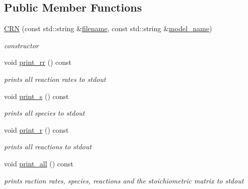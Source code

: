 \subsection*{Public Member Functions}
\begin{DoxyCompactItemize}
\item 
\mbox{\hyperlink{classCRN_acea074d74a2269357d14c6f667649293}{C\+RN}} (const std\+::string \&\mbox{\hyperlink{classCRN_a4ef4514e0ffba7b9358b37636a7f7fb4}{filename}}, const std\+::string \&\mbox{\hyperlink{classCRN_a9ab0e43893870c6961fd0febafc99161}{model\+\_\+name}})
\begin{DoxyCompactList}\small\item\em constructor \end{DoxyCompactList}\item 
void \mbox{\hyperlink{classCRN_a9ea712620fa755231213a59e4da33521}{print\+\_\+rr}} () const
\begin{DoxyCompactList}\small\item\em prints all reaction rates to stdout \end{DoxyCompactList}\item 
void \mbox{\hyperlink{classCRN_a04e77ebd0aab58d87a87555a308c9191}{print\+\_\+s}} () const
\begin{DoxyCompactList}\small\item\em prints all species to stdout \end{DoxyCompactList}\item 
void \mbox{\hyperlink{classCRN_a793a9a8490b0864d765b4ce87a3e3f35}{print\+\_\+r}} () const
\begin{DoxyCompactList}\small\item\em prints all reactions to stdout \end{DoxyCompactList}\item 
void \mbox{\hyperlink{classCRN_a122e6176bc12186e3d90c6d84cd6ce0c}{print\+\_\+all}} () const
\begin{DoxyCompactList}\small\item\em prints raction rates, species, reactions and the stoichiometric matrix to stdout \end{DoxyCompactList}\end{DoxyCompactItemize}
